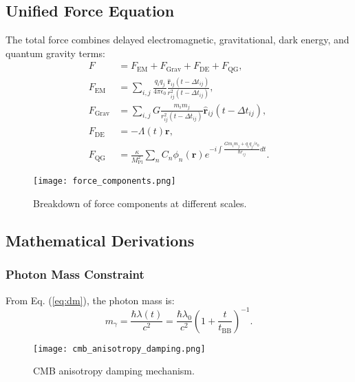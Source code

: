 \documentclass[12pt, a4paper]{article}
\begin{document}
\subsection{Unified Force Equation}

The total force combines delayed electromagnetic, gravitational, dark energy, and quantum gravity terms:
\begin{align}
F &= F_{\text{EM}} + F_{\text{Grav}} + F_{\text{DE}} + F_{\text{QG}}, \label{eq:force} \\
F_{\text{EM}} &= \sum_{i,j} \frac{q_i q_j}{4\pi \epsilon_0} \frac{\hat{\bm{r}}_{ij}(t - \Delta t_{ij})}{r_{ij}^2(t - \Delta t_{ij})}, \nonumber \\
F_{\text{Grav}} &= \sum_{i,j} G \frac{m_i m_j}{r_{ij}^2(t - \Delta t_{ij})} \hat{\bm{r}}_{ij}(t - \Delta t_{ij}), \nonumber \\
F_{\text{DE}} &= -\Lambda(t) \bm{r}, \nonumber \\
F_{\text{QG}} &= \frac{\kappa}{M_{\text{Pl}}^2} \sum_{n} C_n \phi_n(\bm{r}) e^{-i \int \frac{G m_i m_j + q_i q_j / \epsilon_0}{\hbar r_{ij}} dt}. \nonumber
\end{align}

\begin{figure}[h]
\centering
\texttt{[image: force\_components.png]}
\caption{Breakdown of force components at different scales.}
\label{fig:force}
\end{figure}

\subsection{Mathematical Derivations}

\subsubsection{Photon Mass Constraint}

From Eq. (\ref{eq:dm}), the photon mass is:
\begin{equation}
m_\gamma = \frac{\hbar \lambda(t)}{c^2} = \frac{\hbar \lambda_0}{c^2} \left(1 + \frac{t}{t_{\text{BB}}}\right)^{-1}.
\end{equation}

\begin{figure}[h]
\centering
\texttt{[image: cmb\_anisotropy\_damping.png]}
\caption{CMB anisotropy damping mechanism.}
\label{fig:cmb}
\end{figure}
\end{document}
